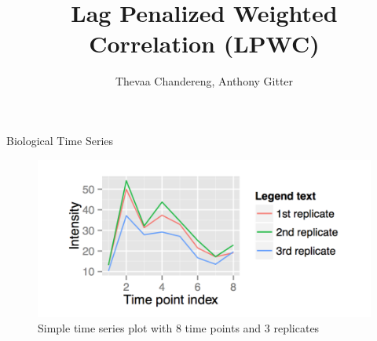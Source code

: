 \documentclass[10pt]{beamer}
\title{Lag Penalized Weighted Correlation (LPWC)}
\date{}
\author{Thevaa Chandereng, Anthony Gitter}
\begin{document}
\maketitle

\begin{frame}{Biological Time Series}

\begin{figure}
  \centering
    \includegraphics[width=1.0\textwidth]{Timeseries.png}
  \caption{Simple time series plot with 8 time points and 3 replicates}
\end{figure} 
   
\end{frame}


%    
%

\end{document}
